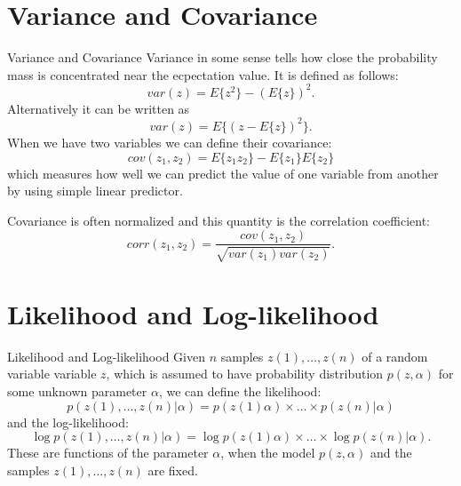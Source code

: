 \documentclass{beamer}
\begin{document}
\section{Variance and Covariance}

\begin{frame}{Variance and Covariance}
  Variance in some sense tells how close the probability mass is concentrated
  near the ecpectation value. It is defined as follows:
  \[
  var(z)= E\{z^2\}-(E\{z\})^2.
  \]
  Alternatively it can be written as
  \[
   var(z) = E\{(z-E\{z\})^2\}.
  \]
  When we have two variables we can define their covariance:
  \[
  cov(z_1, z_2) = E\{z_1 z_2\} - E\{z_1\}E\{z_2\}
  \]
  which measures how well we can predict the value of one variable from another
  by using simple linear predictor.

  Covariance is often normalized and this quantity is the correlation
  coefficient:
  \[
  corr(z_1,z_2) = \frac{cov(z_1, z_2)}{\sqrt{var(z_1)var(z_2)}}.
  \]
\end{frame}

%

\section{Likelihood and Log-likelihood}

\begin{frame}{Likelihood and Log-likelihood}
  Given $n$ samples $z(1), \ldots , z(n)$ of a random variable variable $z$, which
  is assumed to have probability distribution $p(z, \alpha)$ for some unknown
  parameter $\alpha$, we can define the likelihood:
  \[
  p(z(1), \ldots , z(n)|\alpha) = p(z(1)\alpha)\times \ldots \times p(z(n)|\alpha)
  \]
  and the log-likelihood:
  \[
  \log p(z(1), \ldots , z(n)|\alpha) = \log p(z(1)\alpha)\times \ldots \times \log p(z(n)|\alpha).
  \]
  These are functions of the parameter $\alpha$, when the model $p(z, \alpha)$
  and the samples $z(1), \ldots , z(n)$ are fixed.
\end{frame}
\end{document}
